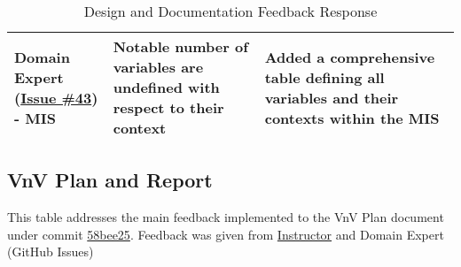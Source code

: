 \documentclass{article}
\begin{document}
\begin{table}[H]
{{\begin{tabular}{|p{5cm}|p{5cm}|p{5.5cm}|}
        \hline
        Domain Expert (\href{https://github.com/AliyahJimoh/2D-Localizer/issues/43}{Issue \#43}) - MIS & Notable number of variables are undefined with respect to their context & Added a comprehensive table defining all variables and their contexts within the MIS \\
        \hline
        \end{tabular}
        }
    }
    \caption{Design and Documentation Feedback Response}
\end{table}

\subsection{VnV Plan and Report}
This table addresses the main feedback implemented to the VnV Plan document under commit \href{https://github.com/AliyahJimoh/2D-Localizer/blob/58bee250016af1738068071b4db4293ccb161fcc/docs/VnVPlan/VnVPlan.pdf}{58bee25}. Feedback was given from \href{https://github.com/AliyahJimoh/2D-Localizer/issues/20}{Instructor} and Domain Expert (GitHub Issues)
\end{document}
